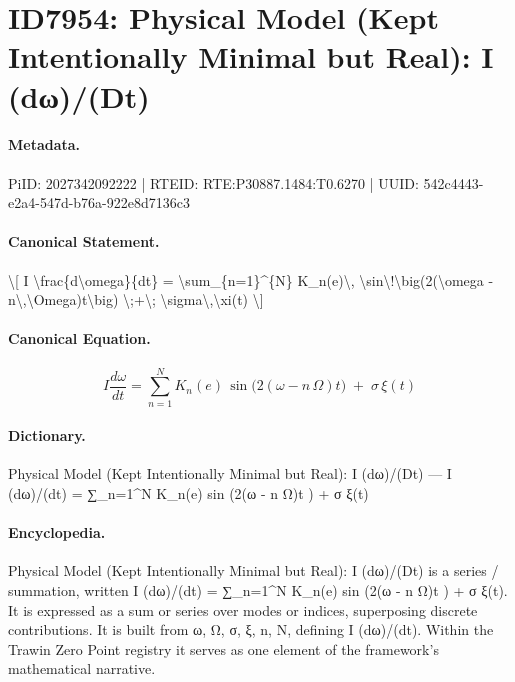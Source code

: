 \section*{ID7954: Physical Model (Kept Intentionally Minimal but Real): I (dω)/(Dt)}
\paragraph{Metadata.}
PiID: 2027342092222 | RTEID: RTE:P30887.1484:T0.6270 | UUID: 542c4443-e2a4-547d-b76a-922e8d7136c3

\paragraph{Canonical Statement.}
\textbackslash{}[ I \textbackslash{}frac\{d\textbackslash{}omega\}\{dt\} = \textbackslash{}sum\_\{n=1\}\textasciicircum{}\{N\} K\_n(e)\textbackslash{}, \textbackslash{}sin\textbackslash{}!\textbackslash{}big(2(\textbackslash{}omega - n\textbackslash{},\textbackslash{}Omega)t\textbackslash{}big) \textbackslash{};+\textbackslash{}; \textbackslash{}sigma\textbackslash{},\textbackslash{}xi(t) \textbackslash{}]

\paragraph{Canonical Equation.}
\[
I \frac{d\omega}{dt} = \sum_{n=1}^{N} K_n(e)\, \sin\!\big(2(\omega - n\,\Omega)t\big) \;+\; \sigma\,\xi(t)
\]

\paragraph{Dictionary.}
Physical Model (Kept Intentionally Minimal but Real): I (dω)/(Dt) — I (dω)/(dt) = ∑\_n=1\textasciicircum{}N K\_n(e) sin (2(ω - n Ω)t ) + σ ξ(t)

\paragraph{Encyclopedia.}
Physical Model (Kept Intentionally Minimal but Real): I (dω)/(Dt) is a series / summation, written I (dω)/(dt) = ∑\_n=1\textasciicircum{}N K\_n(e) sin (2(ω - n Ω)t ) + σ ξ(t). It is expressed as a sum or series over modes or indices, superposing discrete contributions. It is built from ω, Ω, σ, ξ, n, N, defining I (dω)/(dt). Within the Trawin Zero Point registry it serves as one element of the framework's mathematical narrative.
